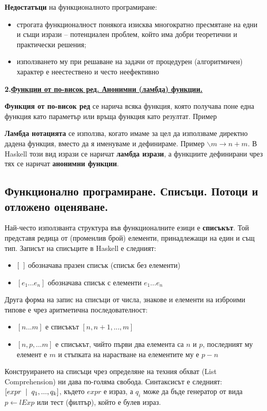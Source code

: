 \documentclass{article}
\begin{document}
\textbf{Недостатъци} на функционалното програмиране:
\begin{itemize}
    \item строгата функционалност понякога изисква многократно пресмятане на едни и същи изрази – потенциален проблем, който
    има добри теоретични и практически решения;
    \item използването му при решаване на задачи от процедурен (алгоритмичен) характер е неестествено и често неефективно
\end{itemize}

\textbf{2.\underline{Функции от по-висок ред. Анонимни (ламбда) функции.}} \newline

\textbf{Функция от по-висок ред} се нарича всяка функция, която получава поне една функция като параметър или връща функция
като резултат. Пример 

\textbf{Ламбда нотацията} се използва, когато имаме за цел да използваме директно дадена функция, вместо да я именуваме и дефинираме.
Пример $\backslash m \rightarrow n + m$. В Haskell този вид изрази се наричат \textbf{ламбда изрази}, а функциите дефинирани чрез
тях се наричат \textbf{анонимни функции}.

\subsection*{Функционално програмиране. Списъци. Потоци и отложено оценяване.}

Най-често използванта структура във функционалните езици е \textbf{списъкът}. Той представя редица от (променлив брой)
елементи, принадлежащи на един и същ тип. Записът на списъците в Haskell е следният:
\begin{itemize}
    \item $[\hspace{0.2cm}]$ обозначава празен списък (списък без елементи)
    \item $[e_1...e_n]$ обозначава списък с елементи $e_1...e_n$
\end{itemize}
Друга форма на запис на списъци от числа, знакове и елементи на изброими типове е чрез аритметична последователност:
\begin{itemize}
    \item $[n...m]$ е списъкът $[n, n + 1, ..., m]$
    \item $[n, p, ... m]$ е списъкът, чийто първи два елемента са $n$ и $p$, последният му елемент е $m$ и стъпката на
    нарастване на елементите му е $p - n$ 
\end{itemize}
Конструирането на списъци чрез определяне на техния обхват (List Comprehension) ни дава по-голяма свобода. Синтаксисът е
следният: $[expr\hspace{0.2cm}|\hspace{0.2cm}q_1, ..., q_k]$, където $expr$ е израз, а $q_i$ може да бъде генератор от вида
$p \leftarrow lExp$ или тест (филтър), който е булев израз.
\end{document}
